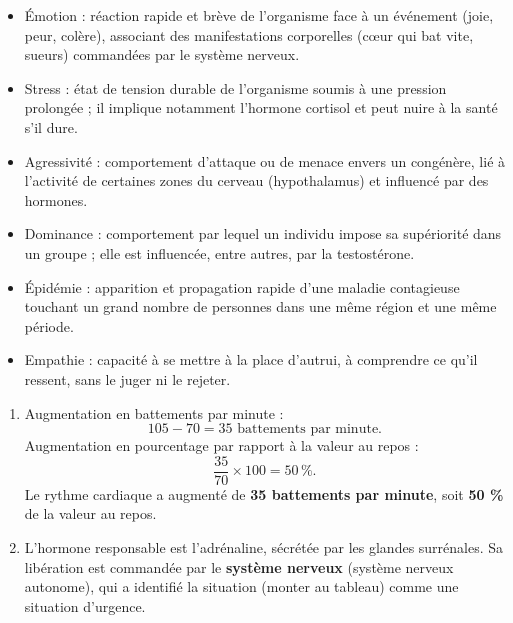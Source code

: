 \documentclass[11pt]{article}
\newcommand{\cle}[1]{{\popxbold\color{popdark}#1}}
\begin{document}
\begin{corrige}
\begin{itemize}
\item \cle{Émotion} : réaction rapide et brève de l'organisme face à un événement (joie, peur, colère), associant des manifestations corporelles (cœur qui bat vite, sueurs) commandées par le système nerveux.
\item \cle{Stress} : état de tension durable de l'organisme soumis à une pression prolongée ; il implique notamment l'hormone cortisol et peut nuire à la santé s'il dure.
\item \cle{Agressivité} : comportement d'attaque ou de menace envers un congénère, lié à l'activité de certaines zones du cerveau (hypothalamus) et influencé par des hormones.
\item \cle{Dominance} : comportement par lequel un individu impose sa supériorité dans un groupe ; elle est influencée, entre autres, par la testostérone.
\item \cle{Épidémie} : apparition et propagation rapide d'une maladie contagieuse touchant un grand nombre de personnes dans une même région et une même période.
\item \cle{Empathie} : capacité à se mettre à la place d'autrui, à comprendre ce qu'il ressent, sans le juger ni le rejeter.
\end{itemize}
\end{corrige}

\begin{corrige}
\begin{enumerate}
\item Augmentation en battements par minute :
\[ 105 - 70 = 35 \text{ battements par minute.} \]
Augmentation en pourcentage par rapport à la valeur au repos :
\[ \frac{35}{70} \times 100 = 50\,\%. \]
Le rythme cardiaque a augmenté de \textbf{35 battements par minute}, soit \textbf{50 \%} de la valeur au repos.
\item L'hormone responsable est l'\cle{adrénaline}, sécrétée par les glandes surrénales. Sa libération est commandée par le \textbf{système nerveux} (système nerveux autonome), qui a identifié la situation (monter au tableau) comme une situation d'urgence.
\end{enumerate}
\end{corrige}
\end{document}
